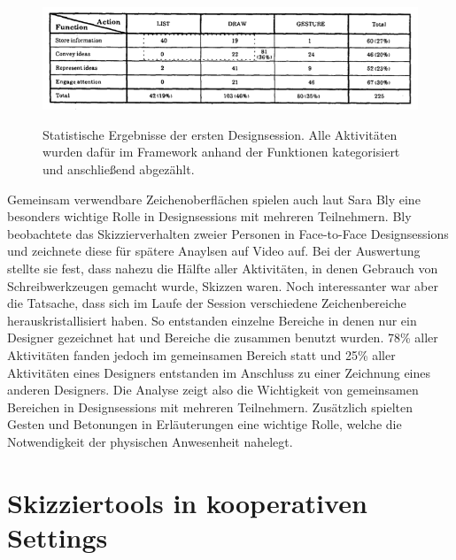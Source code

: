 \begin{figure}
        {\includegraphics[width=1\linewidth]{gfx/tangStatistik}}
		\caption[Statistische Ergebnisse der ersten Designsession.]{Statistische Ergebnisse der ersten Designsession. Alle Aktivitäten wurden dafür im Framework anhand der Funktionen kategorisiert und anschließend abgezählt.}\label{fig:tangStatistik}
\end{figure}
\clearpage

\medskip Gemeinsam verwendbare Zeichenoberflächen spielen auch laut Sara Bly \citep{Bly:1988:UDS:62266.62286} eine besonders wichtige Rolle in Designsessions mit mehreren Teilnehmern. 
Bly beobachtete das Skizzierverhalten zweier Personen in Face-to-Face Designsessions und zeichnete diese für spätere Anaylsen auf Video auf. Bei der Auswertung stellte sie fest, dass nahezu die Hälfte aller Aktivitäten, in denen Gebrauch von Schreibwerkzeugen gemacht wurde, Skizzen waren. Noch interessanter war aber die Tatsache, dass sich im Laufe der Session verschiedene Zeichenbereiche herauskristallisiert haben. So entstanden einzelne Bereiche in denen nur ein Designer gezeichnet hat und Bereiche die zusammen benutzt wurden. 78\% aller Aktivitäten fanden jedoch im gemeinsamen Bereich statt und 25\% aller Aktivitäten eines Designers entstanden im Anschluss zu einer Zeichnung eines anderen Designers. Die Analyse zeigt also die Wichtigkeit von gemeinsamen Bereichen in Designsessions mit mehreren Teilnehmern. Zusätzlich spielten Gesten und Betonungen in Erläuterungen eine wichtige Rolle, welche die Notwendigkeit der physischen Anwesenheit nahelegt.

\section{Skizziertools in kooperativen Settings}


